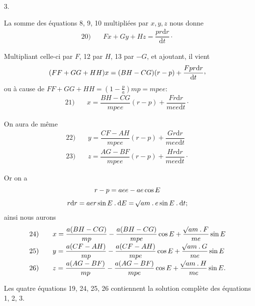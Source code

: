 \par{}\bigskip
{}
\begin{center}3.\end{center}
\noindent\hspace*{\parindent}La somme des équations 8, 9, 10 multipliées par \(x,y,z\) nous donne
\[
\begin{array}{rl}20)\quad&Fx+Gy+Hz=\dfrac{pr\mathrm{d}r}{\mathrm{d}t}\mathpunct{\cdot}\end{array}
\]
\par Multipliant celle-ci par \(F\), 12 par \(H\), 13 par \(-G\), et ajoutant, il vient
\[
(FF+GG+HH)x=(BH-CG)(r-p)+\frac{Fpr\mathrm{d}r}{\mathrm{d}t}\mathpunct{\raisebox{.45ex}{,}}
\]
ou à cause de \(FF+GG+HH=\left(1-\frac{p}{a}\right)mp=mpee\):
\[
\begin{array}{rl}21)\quad&x=\dfrac{BH-CG}{mpee}(r-p)+\dfrac{Fr\mathrm{d}r}{mee\mathrm{d}t}\mathpunct{\cdot}\end{array}
\]
\par On aura de même
\[
\begin{array}{rl}
22)\quad&y=\dfrac{CF-AH}{mpee}(r-p)+\dfrac{Gr\mathrm{d}r}{mee\mathrm{d}t}\\[6pt]
23)\quad&z=\dfrac{AG-BF}{mpee}(r-p)+\dfrac{Hr\mathrm{d}r}{mee\mathrm{d}t}\mathpunct{\cdot}
\end{array}
\]
\par Or on a
\[
\begin{gathered}
r-p=aee-ae\cos E\\[4pt]
r\mathrm{d}r=aer\sin E\mathbin{.}\mathrm{d}E=\mathord{{}^{}\!\surd}am\mathbin{.}e\sin E\mathbin{.}\mathrm{d}t;
\end{gathered}
\]
ainsi nous aurons
\[
\begin{array}{rl}
24)\quad&x=\dfrac{a(BH-CG)}{mp}-\dfrac{a(BH-CG)}{mpe}\cos E+\dfrac{\mathord{{}^{}\!\surd}am\mathbin{.}F}{me}\sin E\\[7pt]
25)\quad&y=\dfrac{a(CF-AH)}{mp}-\dfrac{a(CF-AH)}{mpe}\cos E+\dfrac{\mathord{{}^{}\!\surd}am\mathbin{.}G}{me}\sin E\\[7pt]
26)\quad&z=\dfrac{a(AG-BF)}{mp}-\dfrac{a(AG-BF)}{mpe}\cos E+\dfrac{\mathord{{}^{}\!\surd}am\mathbin{.}H}{me}\sin E.
\end{array}
\]
\par Les quatre équations 19, 24, 25, 26 contiennent la solution complète des équations 1, 2, 3.
